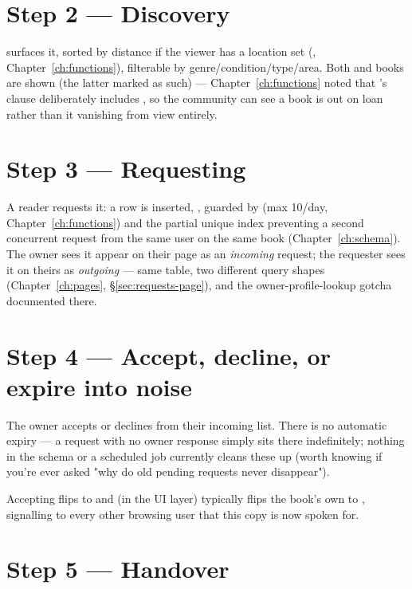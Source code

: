 \section{Step 2 — Discovery}

 surfaces it, sorted by distance if the viewer has a location set (, Chapter~\ref{ch:functions}), filterable by genre/condition/type/area. Both  and  books are shown (the latter marked as such) — Chapter~\ref{ch:functions} noted that 's  clause deliberately includes , so the community can see a book is out on loan rather than it vanishing from view entirely.

\section{Step 3 — Requesting}

A reader requests it: a  row is inserted, , guarded by  (max 10/day, Chapter~\ref{ch:functions}) and the partial unique index preventing a second concurrent request from the same user on the same book (Chapter~\ref{ch:schema}). The owner sees it appear on their  page as an \emph{incoming} request; the requester sees it on theirs as \emph{outgoing} — same table, two different query shapes (Chapter~\ref{ch:pages}, \S\ref{sec:requests-page}), and the owner-profile-lookup gotcha documented there.

\section{Step 4 — Accept, decline, or expire into noise}

The owner accepts or declines from their incoming list. There is no automatic expiry — a  request with no owner response simply sits there indefinitely; nothing in the schema or a scheduled job currently cleans these up (worth knowing if you're ever asked "why do old pending requests never disappear").

Accepting flips  to  and (in the UI layer) typically flips the book's own  to , signalling to every other browsing user that this copy is now spoken for.

\section{Step 5 — Handover}


